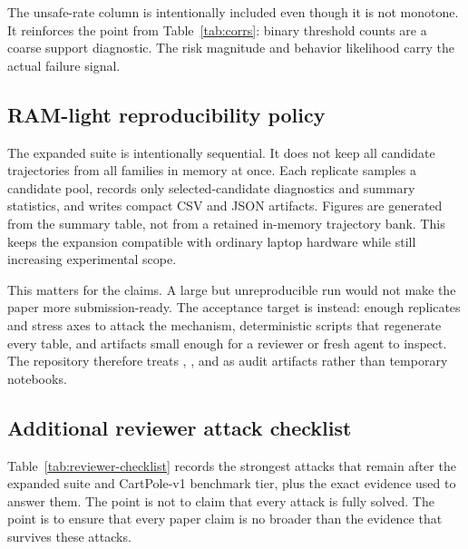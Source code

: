 The unsafe-rate column is intentionally included even though it is not monotone. It reinforces the point from Table~\ref{tab:corrs}: binary threshold counts are a coarse support diagnostic. The risk magnitude and behavior likelihood carry the actual failure signal.

\subsection{RAM-light reproducibility policy}

The expanded suite is intentionally sequential. It does not keep all candidate trajectories from all families in memory at once. Each replicate samples a candidate pool, records only selected-candidate diagnostics and summary statistics, and writes compact CSV and JSON artifacts. Figures are generated from the summary table, not from a retained in-memory trajectory bank. This keeps the expansion compatible with ordinary laptop hardware while still increasing experimental scope.

This matters for the claims. A large but unreproducible run would not make the paper more submission-ready. The acceptance target is instead: enough replicates and stress axes to attack the mechanism, deterministic scripts that regenerate every table, and artifacts small enough for a reviewer or fresh agent to inspect. The repository therefore treats , , and  as audit artifacts rather than temporary notebooks.

\subsection{Additional reviewer attack checklist}

Table~\ref{tab:reviewer-checklist} records the strongest attacks that remain after the expanded suite and CartPole-v1 benchmark tier, plus the exact evidence used to answer them. The point is not to claim that every attack is fully solved. The point is to ensure that every paper claim is no broader than the evidence that survives these attacks.


